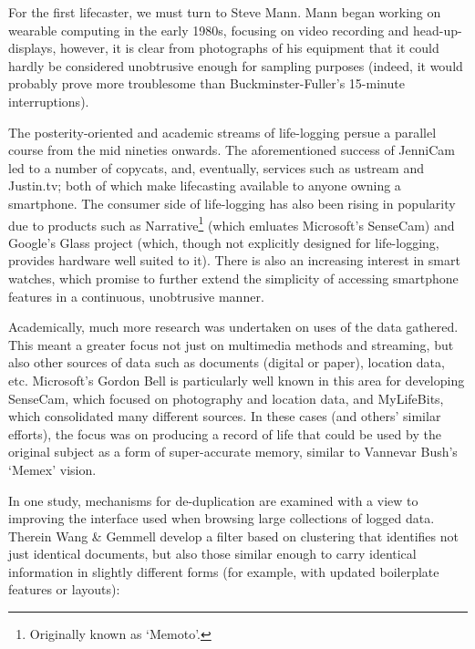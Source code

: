 For the first lifecaster, we must turn to Steve Mann.  Mann began working on wearable computing in the early 1980s\cite{mann1994wearable}, focusing on video recording and head-up-displays, however, it is clear from photographs of his equipment that it could hardly be considered unobtrusive enough for sampling purposes (indeed, it would probably prove more troublesome than Buckminster-Fuller's 15-minute interruptions).

The posterity-oriented and academic streams of life-logging persue a parallel course from the mid nineties onwards.  The aforementioned success of JenniCam led to a number of copycats, and, eventually, services such as ustream\cite{ustream2014homepage} and Justin.tv\cite{justintv2014homepage}; both of which make lifecasting available to anyone owning a smartphone.  The consumer side of life-logging has also been rising in popularity due to products such as Narrative\cite{narrative2014lifelog}\footnote{Originally known as `Memoto'.} (which emluates Microsoft's SenseCam\cite{hodges2006sensecam}) and Google's Glass project (which, though not explicitly designed for life-logging, provides hardware well suited to it).  There is also an increasing interest in smart watches, which promise to further extend the simplicity of accessing smartphone features in a continuous, unobtrusive manner.

Academically, much more research was undertaken on uses of the data gathered.  This meant a greater focus not just on multimedia methods and streaming, but also other sources of data such as documents (digital or paper), location data, etc.  Microsoft's Gordon Bell is particularly well known in this area for developing SenseCam\cite{hodges2006sensecam}, which focused on photography and location data, and MyLifeBits\cite{gemmell2002mylifebits,gemmell2006mylifebits}, which consolidated many different sources.  In these cases (and others' similar efforts\cite{huynh2002haystack,dumais2003stuff,dittrich2006imemex}), the focus was on producing a record of life that could be used by the original subject as a form of super-accurate memory, similar to Vannevar Bush's `Memex' vision\cite{bush1945we}.

In one study, mechanisms for de-duplication are examined with a view to improving the interface used when browsing large collections of logged data\cite{gemmell2006clean}.  Therein Wang \& Gemmell develop a filter based on clustering that identifies not just identical documents, but also those similar enough to carry identical information in slightly different forms (for example, with updated boilerplate features or layouts):

